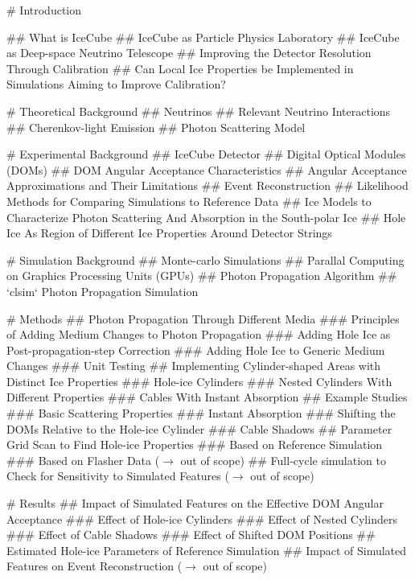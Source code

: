 
\tableofcontents

# Introduction

## What is IceCube
## IceCube as Particle Physics Laboratory
## IceCube as Deep-space Neutrino Telescope
## Improving the Detector Resolution Through Calibration
## Can Local Ice Properties be Implemented in Simulations Aiming to Improve Calibration?

# Theoretical Background
## Neutrinos
## Relevant Neutrino Interactions
## Cherenkov-light Emission
## Photon Scattering Model

# Experimental Background
## IceCube Detector
## Digital Optical Modules (DOMs)
## DOM Angular Acceptance Characteristics
## Angular Acceptance Approximations and Their Limitations
## Event Reconstruction
## Likelihood Methods for Comparing Simulations to Reference Data
## Ice Models to Characterize Photon Scattering And Absorption in the South-polar Ice
## Hole Ice As Region of Different Ice Properties Around Detector Strings

# Simulation Background
## Monte-carlo Simulations
## Parallal Computing on Graphics Processing Units (GPUs)
## Photon Propagation Algorithm
## `clsim` Photon Propagation Simulation

# Methods
## Photon Propagation Through Different Media
### Principles of Adding Medium Changes to Photon Propagation
### Adding Hole Ice as Post-propagation-step Correction
### Adding Hole Ice to Generic Medium Changes
### Unit Testing
## Implementing Cylinder-shaped Areas with Distinct Ice Properties
### Hole-ice Cylinders
### Nested Cylinders With Different Properties
### Cables With Instant Absorption
## Example Studies
### Basic Scattering Properties
### Instant Absorption
### Shifting the DOMs Relative to the Hole-ice Cylinder
### Cable Shadows
## Parameter Grid Scan to Find Hole-ice Properties
### Based on Reference Simulation
### Based on Flasher Data ($\rightarrow$ out of scope)
## Full-cycle simulation to Check for Sensitivity to Simulated Features ($\rightarrow$ out of scope)

# Results
## Impact of Simulated Features on the Effective DOM Angular Acceptance
### Effect of Hole-ice Cylinders
### Effect of Nested Cylinders
### Effect of Cable Shadows
### Effect of Shifted DOM Positions
## Estimated Hole-ice Parameters of Reference Simulation
## Impact of Simulated Features on Event Reconstruction ($\rightarrow$ out of scope)

